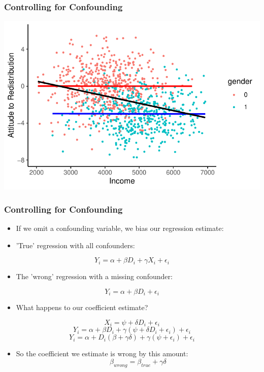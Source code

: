 \documentclass[xcolor=x11names,compress]{beamer}\usepackage[]{graphicx}\usepackage[]{color}
\makeatletter
\def\maxwidth{ %
  \ifdim\Gin@nat@width>\linewidth
    \linewidth
  \else
    \Gin@nat@width
  \fi
}
\newenvironment{knitrout}{}{} %
\renewcommand{\(}{\begin{columns}}
\renewcommand{\)}{\end{columns}}
\newcommand{\<}[1]{\begin{column}{#1}}
\renewcommand{\>}{\end{column}}
\makeatother
\begin{document}
\begin{frame}
\frametitle{Controlling for Confounding}
\begin{knitrout}
\color{fgcolor}
\includegraphics[width=\maxwidth]{figure/confound2-1} 

\end{knitrout}
\end{frame}

\begin{frame}
\frametitle{Controlling for Confounding}
\begin{itemize}
\footnotesize
\item If we omit a confounding variable, we bias our regression estimate:
\pause
\item 'True' regression with all confounders: 
\end{itemize}
$$ Y_i = \alpha + \beta D_i + \gamma X_i + \epsilon_i$$
\begin{itemize}
\pause
\footnotesize
\item The 'wrong' regression with a missing confounder:
\pause
\end{itemize}
$$ Y_i = \alpha + \beta D_i + \epsilon_i$$
\pause
\begin{itemize}
\footnotesize
\item What happens to our coefficient estimate?
\pause
\end{itemize}
$$ X_i = \psi + \delta D_i + \epsilon_i$$
\pause
$$ Y_i = \alpha + \beta D_i + \gamma (\psi + \delta D_i + \epsilon_i) + \epsilon_i $$
\pause
$$ Y_i = \alpha + D_i (\beta + \gamma \delta) + \gamma (\psi  + \epsilon_i) + \epsilon_i $$
\pause
\begin{itemize}
\footnotesize
\item So the coefficient we estimate is wrong by this amount:
\pause
$$ \beta_{wrong} = \beta_{true} + \gamma \delta$$
\end{itemize}
\normalsize
\end{frame}
\end{document}
